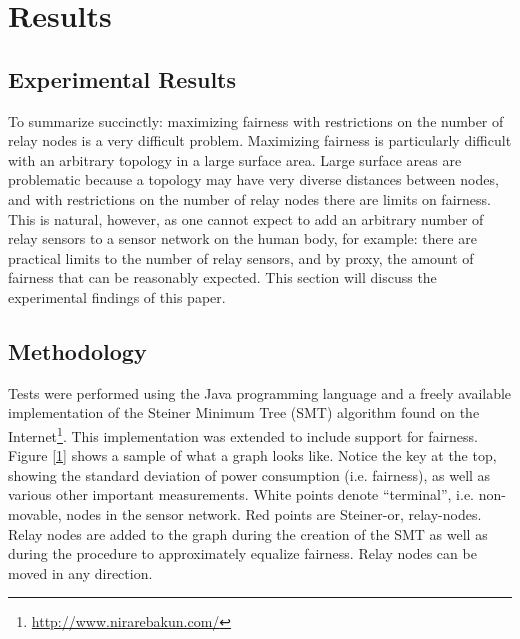 \section{Results}

\subsection{Experimental Results}

To summarize succinctly: maximizing fairness with restrictions on the number of relay nodes is a very difficult problem.  Maximizing fairness is particularly difficult with an arbitrary topology in a large surface area.  Large surface areas are problematic because a topology may have very diverse distances between nodes, and with restrictions on the number of relay nodes there are limits on fairness.  This is natural, however, as one cannot expect to add an arbitrary number of relay sensors to a sensor network on the human body, for example: there are practical limits to the number of relay sensors, and by proxy, the amount of fairness that can be reasonably expected.  This section will discuss the experimental findings of this paper.

\subsection{Methodology}

Tests were performed using the Java programming language and a freely available implementation of the Steiner Minimum Tree (SMT) algorithm found on the Internet\footnote{\url{http://www.nirarebakun.com/}}.  This implementation was extended to include support for fairness.   Figure \ref{1} shows a sample of what a graph looks like.  Notice the key at the top, showing the standard deviation of power consumption (i.e. fairness), as well as various other important measurements.  White points denote ``terminal'', i.e. non-movable, nodes in the sensor network.  Red points are Steiner-or, relay-nodes.  Relay nodes are added to the graph during the creation of the SMT as well as during the procedure to approximately equalize fairness.  Relay nodes can be moved in any direction.

